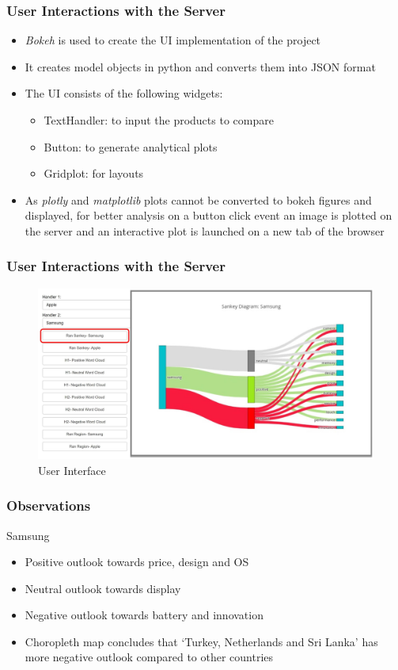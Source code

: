 \documentclass{beamer}
\begin{document}
\begin{frame}
\frametitle{User Interactions with the Server}
\begin{itemize}
\item \textit{Bokeh} is used to create the UI implementation of the project
\item It creates model objects in python and converts them into JSON format
\item The UI consists of the following widgets:
\begin{itemize}
\item TextHandler: to input the products to compare
\item Button: to generate analytical plots
\item Gridplot: for layouts
\end{itemize}
\item As \textit{plotly} and \textit{matplotlib} plots cannot be converted to bokeh figures and displayed, for better analysis on a button click event an image is plotted on the server and an interactive plot is launched on a new tab of the browser
\end{itemize}
\end{frame}

\begin{frame}
\frametitle{User Interactions with the Server}
\begin{figure}
\includegraphics[scale=0.45]{Bokeh}
\caption{User Interface}
\end{figure}
\end{frame}

\begin{frame}
\frametitle{Observations}
{\Large Samsung}
\begin{itemize}
\item Positive outlook towards price, design and OS
\item Neutral outlook towards display 
\item Negative outlook towards battery and innovation
\item Choropleth map concludes that ‘Turkey, Netherlands and Sri Lanka’ has more negative outlook compared to other countries
\end{itemize}
\end{frame}
\end{document}
